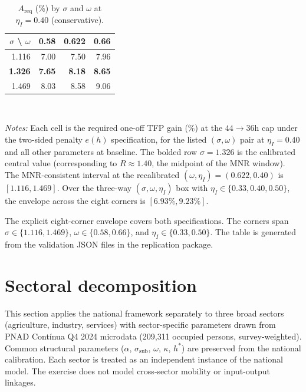 \documentclass[12pt,a4paper]{article}
\begin{document}
\begin{table}[htbp]
\centering
\caption{$A_{\text{req}}$ (\%) by $\sigma$ and $\omega$ at $\eta_I=0.40$ (conservative).}\label{tab:heatmap}
\small
\begin{tabular}{r|rrr}
\hline\hline
$\sigma$ \textbackslash{} $\omega$ & 0.58 & 0.622 & 0.66 \\
\hline
1.116 & 7.00 & 7.50 & 7.96 \\
\textbf{1.326} & \textbf{7.65} & \textbf{8.18} & \textbf{8.65} \\
1.469 & 8.03 & 8.58 & 9.06 \\
\hline\hline
\end{tabular}
\\[2pt]
\begin{minipage}{0.80\textwidth}
\justifying
{\footnotesize \textit{Notes:} Each cell is the required one-off TFP gain (\%) at the $44\to 36$h cap under the two-sided penalty $e(h)$ specification, for the listed $(\sigma,\omega)$ pair at $\eta_I=0.40$ and all other parameters at baseline. The bolded row $\sigma=1.326$ is the calibrated central value (corresponding to $R\approx 1.40$, the midpoint of the MNR window). The MNR-consistent interval at the recalibrated $(\omega,\eta_I)=(0.622,0.40)$ is $[1.116,1.469]$. Over the three-way $(\sigma,\omega,\eta_I)$ box with $\eta_I\in\{0.33,0.40,0.50\}$, the envelope across the eight corners is $[6.93\%,9.23\%]$.}
\end{minipage}
\end{table}

The explicit eight-corner envelope covers both specifications. The corners span $\sigma\in\{1.116,1.469\}$, $\omega\in\{0.58,0.66\}$, and $\eta_I\in\{0.33,0.50\}$. The table is generated from the validation JSON files in the replication package.



\clearpage
\section{Sectoral decomposition}\label{app:sectoral}

This section applies the national framework separately to three broad sectors (agriculture, industry, services) with sector-specific parameters drawn from PNAD Cont\'{i}nua Q4 2024 microdata (209{,}311 occupied persons, survey-weighted). Common structural parameters ($\alpha$, $\sigma_{\text{sub}}$, $\omega$, $\kappa$, $h^*$) are preserved from the national calibration. Each sector is treated as an independent instance of the national model. The exercise does not model cross-sector mobility or input-output linkages.
\end{document}
